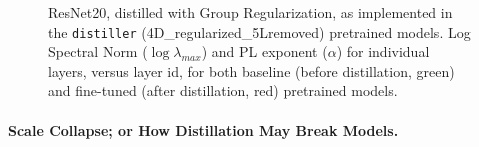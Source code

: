 \begin{figure}[t]
   \centering
   \caption{%
            ResNet20, distilled with Group Regularization, as implemented in the \texttt{distiller} (4D\_regularized\_5Lremoved) pretrained models.  
            Log Spectral Norm ($\log\lambda_{max}$) and PL exponent ($\alpha$) for individual layers, versus layer id, for both baseline (before distillation, green) and fine-tuned (after distillation, red) pretrained models. 
           }
   \label{fig:resnet204D5L}
\end{figure}


\paragraph{Scale Collapse; or How Distillation May Break Models.}

